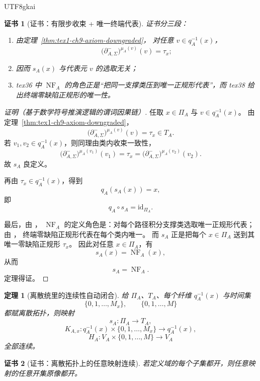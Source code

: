 \documentclass[12pt]{article}
\newtheorem{theorem}{定理}[section]
\newtheorem{Certificate}{证书}[section]
\newcommand{\id}{\mathrm{id}}
\begin{document}
\begin{CJK*}{UTF8}{gkai}
\begin{Certificate}[证书：有限步收束 + 唯一终端代表]
\label{cert:tex1-ch9-section}
证书分三段：
\begin{enumerate}
  \item 由定理~\ref{thm:tex1-ch9-axiom-downgraded}，
  对任意 \(v\in q_A^{-1}(x)\)，
  \[
    \bigl(\partial^-_{A,\Sigma}\bigr)^{\mu_A(v)}(v)=\tau_x;
  \]
  \item 因而 \(s_A(x)\) 与代表元 \(v\) 的选取无关；
  \item tex36 中 \(\operatorname{NF}_A\) 的角色正是“把同一支撑类压到唯一正规形代表”，而 tex38 给出终端零缺陷正规形的唯一性。
\end{enumerate}
\end{Certificate}

\begin{proof}[证明（基于数学符号推演逻辑的谓词因果链）]
任取 \(x\in \Pi_A\) 与 \(v\in q_A^{-1}(x)\)。
由定理~\ref{thm:tex1-ch9-axiom-downgraded}，
\[
  \bigl(\partial^-_{A,\Sigma}\bigr)^{\mu_A(v)}(v)=\tau_x\in T_A.
\]
若 \(v_1,v_2\in q_A^{-1}(x)\)，则同理由类内收束一致性，
\[
  \bigl(\partial^-_{A,\Sigma}\bigr)^{\mu_A(v_1)}(v_1)
  =
  \tau_x
  =
  \bigl(\partial^-_{A,\Sigma}\bigr)^{\mu_A(v_2)}(v_2).
\]
故 \(s_A\) 良定义。

再由 \(\tau_x\in q_A^{-1}(x)\)，得到
\[
  q_A(s_A(x))=x,
\]
即
\[
  q_A\circ s_A=\id_{\Pi_A}.
\]

最后，由 \cite{RepoTex36HomotopyTwistEquivalence}，
\(\operatorname{NF}_A\) 的定义角色是：对每个路径积分支撑类选取唯一正规形代表；
由 \cite{RepoTex38JacobiBianchiRepair}，
终端零缺陷正规形代表在每个类内唯一。
而 \(s_A\) 正是把每个 \(x\in\Pi_A\) 送到其唯一零缺陷正规形 \(\tau_x\)。
因此对任意 \(x\in\Pi_A\)，有
\[
  s_A(x)=\operatorname{NF}_A(x),
\]
从而
\[
  s_A=\operatorname{NF}_A.
\]
定理得证。
\end{proof}

\begin{theorem}[离散统里的连续性自动闭合]
\label{thm:tex1-ch9-continuity}
给 \(\Pi_A\)、\(T_A\)、每个纤维 \(q_A^{-1}(x)\) 与时间集
\[
  \{0,1,\dots,M_x\},
  \qquad
  \{0,1,\dots,M\}
\]
都赋离散拓扑，则映射
\[
  s_A:\Pi_A\to T_A,
\]
\[
  K_{A,x}:q_A^{-1}(x)\times\{0,1,\dots,M_x\}\to q_A^{-1}(x),
\]
\[
  H_A:V_A\times\{0,1,\dots,M\}\to V_A
\]
全部连续。
\end{theorem}

\begin{Certificate}[证书：离散拓扑上的任意映射连续]
\label{cert:tex1-ch9-continuity}
若定义域的每个子集都开，则任意映射的任意开集原像都开。
\end{Certificate}


\end{CJK*}
\end{document}
